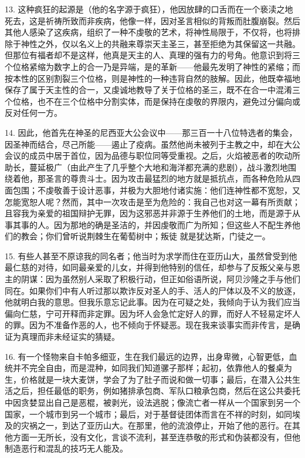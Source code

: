 13. 这种疯狂的起源是（他的名字源于疯狂），他因放肆的口舌而在一个亵渎之地死去，这是祈祷所致而非疾病，他像一样，因对圣言相似的背叛而肚腹崩裂。然后其他人感染了这疾病，组织了一种不虔敬的艺术，将神性局限于，不仅将，也将排除于神性之外，仅以名义上的共融来尊崇天主圣三，甚至拒绝为其保留这一共融。但那位有福者却不是这样，他真是天主的人、真理的强有力的号角。他意识到将三个位格紧缩为数字上的合一乃是异端，是的革新——他最先发明了神性的紧缩；而按本性的区别割裂三个位格，则是神性的一种违背自然的肢解。因此，他既幸福地保存了属于天主性的合一，又虔诚地教导了关于位格的圣三，既不在合一中混淆三个位格，也不在三个位格中分割实体，而是保持在虔敬的界限内，避免过分偏向或反对任何一方。\par

14. 因此，他首先在神圣的尼西亚大公会议中——那三百一十八位特选者的集会，因圣神而结合，尽己所能——遏止了疫病。虽然他尚未被列于主教之中，却在大公会议的成员中居于首位，因为品德与职位同等受重视。之后，火焰被恶者的吹动所助长，蔓延极广（由此产生了几乎整个大地和海洋都充满的悲剧），战斗激烈地围绕着他，那圣言的尊贵斗士。因为攻击最猛烈的地方就是抵抗点，而各种危险从四面包围；不虔敬善于设计恶事，并极为大胆地付诸实施：他们连神性都不宽恕，又怎能宽恕人呢？然而，其中一次攻击是至为危险的：我自己也对这一幕有所贡献；且容我为亲爱的祖国辩护无罪，因为这邪恶并非源于生养他们的土地，而是源于从事其事的人。因为那地的确是圣洁的，并因虔敬而广为所知；但这些人不配生养他们的教会；你们曾听说荆棘生在葡萄树中；叛徒 就是犹达斯，门徒之一。\par

15. 有些人甚至不原谅我的同名者；他当时为求学而住在亚历山大，虽然曾受到他最仁慈的对待，如同最亲爱的儿女，并得到他特别的信任，却参与了反叛父亲与恩主的阴谋：因为虽然别人采取了积极行动，但正如俗语所说，阿贝沙隆之手与他们同在。如果你们中有人听过那以欺诈反对圣人的手、活人的尸体以及不义的放逐，他就明白我的意思。但我乐意忘记此事。因为在可疑之处，我倾向于认为我们应当偏向仁慈，宁可开释而非定罪。因为坏人会急忙定好人的罪，而好人不轻易定坏人的罪。因为不准备作恶的人，也不倾向于怀疑恶。现在我来谈事实而非传言，是确证为真理而非未经证实的猜疑。\par

16. 有一个怪物来自卡帕多细亚，生在我们最远的边界，出身卑微，心智更低，血统并不完全自由，而是混种，如同我们知道骡子那样；起初，依靠他人的餐桌为生，价格就是一块大麦饼，学会了为了肚子而说和做一切事；最后，在潜入公共生活之后，担任最低的职务，例如猪排承包商、军队口粮承包商，然后在这公共委托中因贪婪显出自己是恶棍，被剥光，设法逃脱；像流亡者一样从一个国家到另一个国家，一个城市到另一个城市；最后，对于基督徒团体而言在不祥的时刻，如同埃及的灾祸之一，到达了亚历山大。在那里，他的流浪停止，开始了他的恶行。在其他方面一无所长，没有文化，言谈不流利，甚至连恭敬的形式和伪装都没有，但他制造恶行和混乱的技巧无人能及。\par

